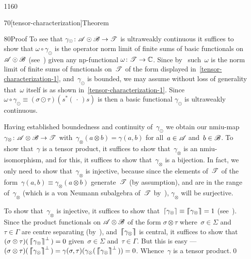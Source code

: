 \begin{parsec}{1160}
\begin{point}{70}[tensor-characterization]{Theorem}
\begin{point}{80}{Proof}
To see that $\gamma_\odot\colon \mathscr{A}\odot\mathscr{B}\to\mathscr{T}$
is ultraweakly continuous
it suffices to show that  $\omega\circ \gamma_\odot$
is the operator norm limit of finite sums of basic functionals
on~$\mathscr{A}\odot\mathscr{B}$
(see~)
given any np-functional $\omega\colon \mathscr{T}\to\mathbb{C}$.
Since by~ such~$\omega$
is the norm limit
of finite sums of
functionals on~$\mathscr{T}$
of the form displayed in~\eqref{tensor-characterization-1},
and~$\gamma_\odot$
is bounded,
we may assume without loss of generality
that~$\omega$
itself is as shown in~\eqref{tensor-characterization-1}.
Since $\omega\circ \gamma_\odot 
\equiv (\sigma\odot\tau)(s^*(\,\cdot\,)s)$
is then a basic functional $\gamma_\odot$
is ultraweakly continuous.

Having established boundedness and continuity
of~$\gamma_\odot$
we obtain our  nmiu-map $\gamma_\otimes\colon \mathscr{A}\otimes\mathscr{B}
\to\mathscr{T}$
with~$\gamma_\otimes(a\otimes b)=\gamma(a,b)$
for all~$a\in\mathscr{A}$ and~$b\in \mathscr{B}$.
To show that~$\gamma$ is a tensor product,
it suffices
to show that~$\gamma_\otimes$
is an nmiu-isomorphism,
and for this,
it suffices
to show that~$\gamma_\otimes$ is a bijection.
In fact, 
we only need to show that~$\gamma_\otimes$ is injective,
because since the elements
of~$\mathscr{T}$ of the form~$\gamma(a,b)\equiv\gamma_\otimes(a\otimes b)$
generate~$\mathscr{T}$ (by assumption),
and are in the range of~$\gamma_\otimes$
(which is a von Neumann subalgebra of~$\mathscr{T}$
by~),
$\gamma_\otimes$ will be surjective.

To show that~$\gamma_\otimes$ is injective,
it suffices to show that~$\left\lceil\gamma_\otimes\right\rceil\equiv\left\lceil\!\!\left\lceil\gamma_\otimes\right\rceil\!\!\right\rceil
=1$
(see~).
Since the product functionals on $\mathscr{A}\otimes\mathscr{B}$
of the form $\sigma\otimes \tau$
where~$\sigma\in\Sigma$ and~$\tau\in\Gamma$
are centre separating (by~),
and~$\left\lceil\!\!\left\lceil\gamma_\otimes\right\rceil\!\!\right\rceil$ is central,
it suffices to show that
$(\sigma\otimes\tau)(\,\left\lceil\!\!\left\lceil\gamma_\otimes\right\rceil\!\!\right\rceil^\perp\,)=0$
given~$\sigma\in\Sigma$ and~$\tau\in\Gamma$.
But this is easy ---
$(\sigma\otimes \tau)(\,\cceil{\gamma_\otimes}^\perp \,)
=
\gamma(\sigma, \tau)(\gamma_\otimes(\,\cceil{\gamma_\otimes}^\perp \,))
= 0$.
Whence~$\gamma$ is a tensor product.\qed
\end{point}
\end{point}
\end{parsec}
